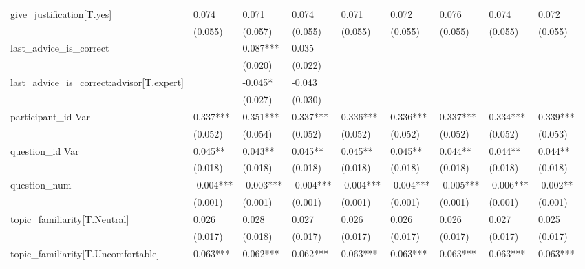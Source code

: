 \begin{table}
\begin{center}
\begin{tabular}{lllllllll}
give\_justification[T.yes]                   & 0.074     & 0.071     & 0.074     & 0.071     & 0.072     & 0.076     & 0.074     & 0.072     \\
                                             & (0.055)   & (0.057)   & (0.055)   & (0.055)   & (0.055)   & (0.055)   & (0.055)   & (0.055)   \\
last\_advice\_is\_correct                    &           & 0.087***  & 0.035     &           &           &           &           &           \\
                                             &           & (0.020)   & (0.022)   &           &           &           &           &           \\
last\_advice\_is\_correct:advisor[T.expert]  &           & -0.045*   & -0.043    &           &           &           &           &           \\
                                             &           & (0.027)   & (0.030)   &           &           &           &           &           \\
participant\_id Var                          & 0.337***  & 0.351***  & 0.337***  & 0.336***  & 0.336***  & 0.337***  & 0.334***  & 0.339***  \\
                                             & (0.052)   & (0.054)   & (0.052)   & (0.052)   & (0.052)   & (0.052)   & (0.052)   & (0.053)   \\
question\_id Var                             & 0.045**   & 0.043**   & 0.045**   & 0.045**   & 0.045**   & 0.044**   & 0.044**   & 0.044**   \\
                                             & (0.018)   & (0.018)   & (0.018)   & (0.018)   & (0.018)   & (0.018)   & (0.018)   & (0.018)   \\
question\_num                                & -0.004*** & -0.003*** & -0.004*** & -0.004*** & -0.004*** & -0.005*** & -0.006*** & -0.002**  \\
                                             & (0.001)   & (0.001)   & (0.001)   & (0.001)   & (0.001)   & (0.001)   & (0.001)   & (0.001)   \\
topic\_familiarity[T.Neutral]                & 0.026     & 0.028     & 0.027     & 0.026     & 0.026     & 0.026     & 0.027     & 0.025     \\
                                             & (0.017)   & (0.018)   & (0.017)   & (0.017)   & (0.017)   & (0.017)   & (0.017)   & (0.017)   \\
topic\_familiarity[T.Uncomfortable]          & 0.063***  & 0.062***  & 0.062***  & 0.063***  & 0.063***  & 0.063***  & 0.063***  & 0.063***  \\

\end{tabular}
\end{center}
\end{table}
